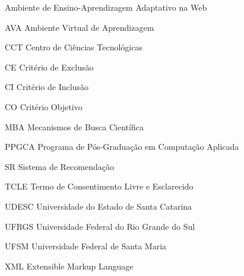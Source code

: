 \documentclass[
	12pt,				%
	openright,			%
	oneside,
	a4paper,			%
	chapter=TITLE,		%
	section=TITLE,		%
	english,			%
	brazil,				%
  hidelinks
	]{abntex2}
\begin{document}


\begin{siglas}
  \SingleSpacing
  \item[\adaptweb]  Ambiente de Ensino-Aprendizagem Adaptativo na Web
  \item[AVA]       Ambiente Virtual de Aprendizagem
  \item[CCT]       Centro de Ciências Tecnológicas
  \item[CE]        Critério de Exclusão
  \item[CI]        Critério de Inclusão
  \item[CO]        Critério Objetivo
  \item[MBA]       Mecanismos de Busca Científica
  \item[PPGCA]     Programa de Pós-Graduação em Computação Aplicada
  \item[SR]        Sistema de Recomendação
  \item[TCLE]      Termo de Consentimento Livre e Esclarecido
  \item[UDESC]     Universidade do Estado de Santa Catarina
  \item[UFRGS]     Universidade Federal do Rio Grande do Sul
  \item[UFSM]      Universidade Federal de Santa Maria
  \item[XML]       Extensible Markup Language
\end{siglas}


\tableofcontents*
\cleardoublepage

\textual

\pagestyle{eudesc}









%

\postextual


\end{document}
